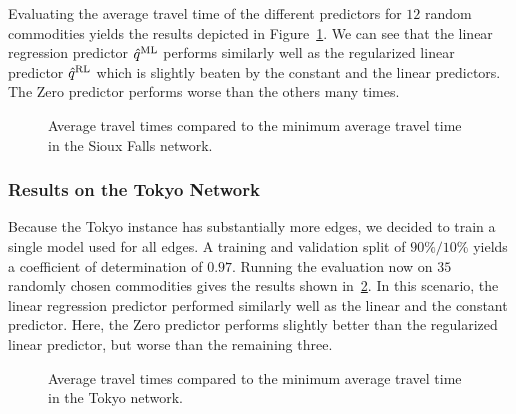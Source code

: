 Evaluating the average travel time of the different predictors for $12$ random commodities yields the results depicted in Figure~\ref{fig:sioux-falls-boxplot}.
We can see that the linear regression predictor $\hat q^{\text{ML}}$ performs similarly well as the regularized linear predictor $\hat q^{\text{RL}}$ which is slightly beaten by the constant and the linear predictors.
The Zero predictor performs worse than the others many times.


\begin{figure}
    \centering
    
    \caption{Average travel times compared to the minimum average travel time in the Sioux Falls network.}
    \label{fig:sioux-falls-boxplot}
\end{figure}



\subsubsection*{Results on the Tokyo Network}

Because the Tokyo instance has substantially more edges, we decided to train a single model used for all edges.
A training and validation split of $90\%/10\%$ yields a coefficient of determination of $0{.}97$.
Running the evaluation now on $35$ randomly chosen commodities gives the results shown in~\ref{fig:tokyo-boxplot}.
In this scenario, the linear regression predictor performed similarly well as the linear and the constant predictor.
Here, the Zero predictor performs slightly better than the regularized linear predictor, but worse than the remaining three.


\begin{figure}
    \centering
    
    \caption{Average travel times compared to the minimum average travel time in the Tokyo network.}
    \label{fig:tokyo-boxplot}
\end{figure}
